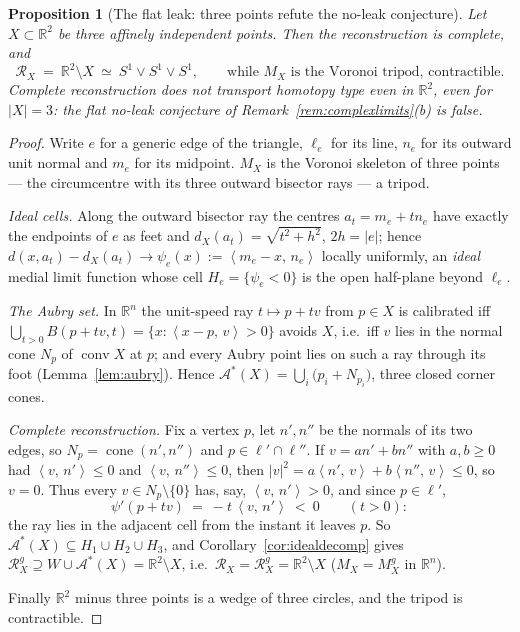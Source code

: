 \documentclass[11pt]{article}
\newtheorem{proposition}[theorem]{Proposition}
\theoremstyle{remark}
\newcommand{\R}{\mathbb{R}}
\newcommand{\X}{X}
\newcommand{\Mx}{M_{\X}}
\newcommand{\Mg}{M^{g}_{\X}}
\newcommand{\Rx}{\mathcal{R}_{\X}}
\newcommand{\Rg}{\mathcal{R}^{g}_{\X}}
\newcommand{\dX}{d_{\X}}
\newcommand{\conv}{\operatorname{conv}}
\newcommand{\sca}[2]{\left\langle #1,\, #2\right\rangle}
\newcommand{\Aub}{\mathcal{A}^{\ast}}
\begin{document}
\begin{proposition}[The flat leak: three points refute the no-leak
conjecture]\label{prop:flatleak}
Let $\X\subset\R^{2}$ be three affinely independent points. Then
the reconstruction is complete, and
\[
  \Rx\ =\ \R^{2}\setminus\X\ \simeq\ S^{1}\vee S^{1}\vee S^{1},
  \qquad\text{while $\Mx$ is the Voronoi tripod, contractible.}
\]
Complete reconstruction does not transport homotopy type even in
$\R^{2}$, even for $|\X|=3$: the flat no-leak conjecture of
Remark~\ref{rem:complexlimits}(b) is false.
\end{proposition}

\begin{proof}
Write $e$ for a generic edge of the triangle, $\ell_{e}$ for its
line, $n_{e}$ for its outward unit normal and $m_{e}$ for its
midpoint. $\Mx$ is the Voronoi skeleton of three points --- the
circumcentre with its three outward bisector rays --- a tripod.

\emph{Ideal cells.} Along the outward bisector ray the centres
$a_{t}=m_{e}+tn_{e}$ have exactly the endpoints of $e$ as feet and
$\dX(a_{t})=\sqrt{t^{2}+h^{2}}$, $2h=|e|$; hence
$d(x,a_{t})-\dX(a_{t})\to\psi_{e}(x):=\sca{m_{e}-x}{n_{e}}$ locally
uniformly, an \emph{ideal} medial limit function whose cell
$H_{e}=\{\psi_{e}<0\}$ is the open half-plane beyond $\ell_{e}$.

\emph{The Aubry set.} In $\R^{n}$ the unit-speed ray $t\mapsto p+tv$
from $p\in\X$ is calibrated iff
$\bigcup_{t>0}B(p+tv,t)=\{x:\sca{x-p}{v}>0\}$ avoids $\X$, i.e.\ iff
$v$ lies in the normal cone $N_{p}$ of $\conv\X$ at $p$; and every
Aubry point lies on such a ray through its foot
(Lemma~\ref{lem:aubry}). Hence
$\Aub(\X)=\bigcup_{i}\bigl(p_{i}+N_{p_{i}}\bigr)$, three closed
corner cones.

\emph{Complete reconstruction.} Fix a vertex $p$, let $n',n''$ be
the normals of its two edges, so
$N_{p}=\operatorname{cone}(n',n'')$ and $p\in\ell'\cap\ell''$. If
$v=an'+bn''$ with $a,b\ge0$ had $\sca{v}{n'}\le0$ and
$\sca{v}{n''}\le0$, then
$|v|^{2}=a\sca{n'}{v}+b\sca{n''}{v}\le0$, so $v=0$. Thus every
$v\in N_{p}\setminus\{0\}$ has, say, $\sca{v}{n'}>0$, and since
$p\in\ell'$,
\[
  \psi'(p+tv)\ =\ -t\,\sca{v}{n'}\ <\ 0\qquad(t>0):
\]
the ray lies in the adjacent cell from the instant it leaves $p$.
So $\Aub(\X)\subseteq H_{1}\cup H_{2}\cup H_{3}$, and
Corollary~\ref{cor:idealdecomp} gives
$\Rg\supseteq W\cup\Aub(\X)=\R^{2}\setminus\X$, i.e.\
$\Rx=\Rg=\R^{2}\setminus\X$ ($\Mx=\Mg$ in $\R^{n}$).

Finally $\R^{2}$ minus three points is a wedge of three circles,
and the tripod is contractible.
\end{proof}
\end{document}
